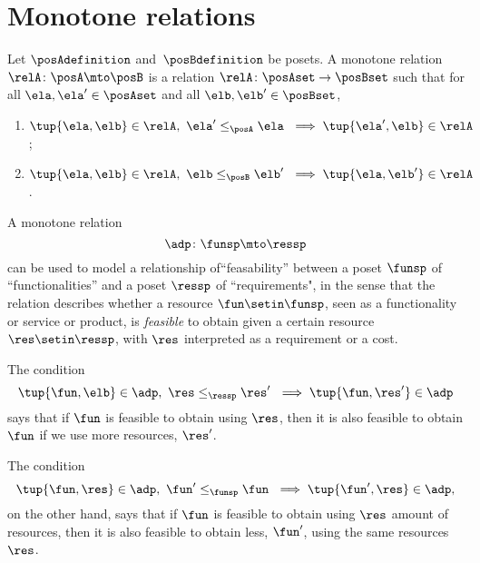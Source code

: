 \section{Monotone relations}



\begin{definition}
Let $\posAdefinition$ and~$\posBdefinition$ be posets. A monotone relation $\relA \colon \posA \mto \posB$ is a relation $\relA \colon \posAset \to \posBset$ such that for all $\ela, \ela' \in \posAset$ and all $\elb, \elb' \in \posBset$, 
\begin{enumerate}
\item $\tup{\ela, \elb} \in \relA, \ \ela' \leq_{\posA} \ela \ \implies \tup{\ela', \elb} \in \relA$;
\item $\tup{\ela, \elb} \in \relA, \ \elb \leq_{\posB} \elb' \ \implies \tup{\ela, \elb'} \in \relA$.
\end{enumerate}
\end{definition}

A monotone relation
\begin{equation}
\adp \colon \funsp \mto \ressp
\end{equation}
can be used to model a relationship of``feasability'' between a poset $\funsp$ of ``functionalities'' and a poset $\ressp$ of ``requirements", in the sense that the relation describes whether a resource $\fun \setin \funsp$, seen as a functionality or service or product, is \emph{feasible} to obtain given a certain resource $\res \setin \ressp$, with $\res$ interpreted as a requirement or a cost.

The condition
\begin{equation}
\tup{\fun, \elb} \in \adp, \ \res \leq_{\ressp} \res' \ \implies \tup{\fun, \res'} \in \adp
\end{equation}
says that if $\fun$ is feasible to obtain using $\res$, then it is also feasible to obtain $\fun$ if we use more resources, $\res'$. 

The condition
\begin{equation}
\tup{\fun, \res} \in \adp, \ \fun' \leq_{\funsp} \fun \ \implies \tup{\fun', \res} \in \adp,
\end{equation}
on the other hand, says that if $\fun$ is feasible to obtain using $\res$ amount of resources, then it is also feasible to obtain less, $\fun'$, using the same resources $\res$. 